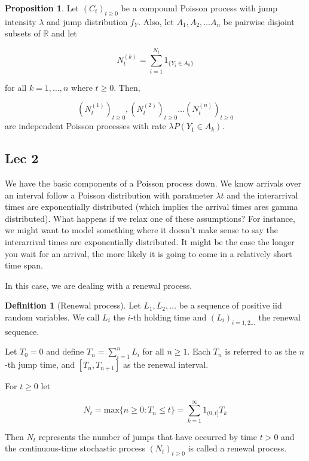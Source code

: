 \documentclass[12pt]{article}
\theoremstyle{definition}
\newtheorem{definition}{Definition}[section]
\newtheorem{proposition}{Proposition}[section]
\begin{document}
\begin{proposition}
  Let $(C_t)_{t \geq 0}$ be a compound Poisson process with jump intensity $\lambda$ and jump distribution $f_Y$. Also, let $A_1, A_2, \dots A_n$ be pairwise disjoint subsets of $\mathbb{R}$ and let

  $$
  N_t^{(k)} = \sum_{i=1}^{N_t} 1_{\{Y_i \in A_k\}}
  $$

   for all $k=1, \dots, n$ where $t \geq 0$. Then,

  $$
  (N_t^{(1)})_{t \geq 0},   (N_t^{(2)})_{t \geq 0} \dots   (N_t^{(n)})_{t \geq 0}
  $$
  are independent Poisson processes with rate $\lambda P(Y_1 \in A_k)$.
\end{proposition}

\subsection{Lec 2}

We have the basic components of a Poisson process down. We know arrivals over an interval follow a Poisson distribution with paratmeter $\lambda t $ and the interarrival times are exponentially distributed (which implies the arrival times ares gamma distributed). What happens if we relax one of these assumptions? For instance, we might want to model something where it doesn't make sense to say the interarrival times are exponentially distributed. It might be the case the longer you wait for an arrival, the more likely it is going to come in a relatively short time span.

In this case, we are dealing with a renewal process.

\begin{definition}[Renewal process]
  Let $L_1, L_2, \dots$ be a sequence of positive iid random variables. We call $L_i$ the $i$-th holding time and $(L_i)_{i = 1, 2 \dots} $ the renewal sequence.

  Let $T_0 = 0$ and define $T_n = \sum_{i=1}^n L_i$ for all $n \geq 1$. Each $T_n$ is referred to as the $n$-th jump time, and $[T_n, T_{n+1}]$ as the renewal interval.

  For $t \geq 0$ let

  $$
  N_t = \text{max}\{n \geq 0: T_n \leq t\} = \sum_{k=1}^\infty 1_{(0,t]} T_k
  $$

  Then $N_t$ represents the number of jumps that have occurred by time $t > 0$ and the continuous-time stochastic process $(N_t)_{t \geq 0}$ is called a renewal process.

\end{definition}
\end{document}

